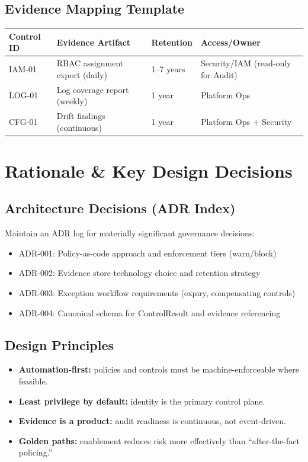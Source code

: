 \documentclass[11pt]{report}
\begin{document}
\subsection{Evidence Mapping Template}
\begin{tabularx}{\textwidth}{@{}l l l >{\raggedright\arraybackslash}X@{}}
\toprule
\textbf{Control ID} & \textbf{Evidence Artifact} & \textbf{Retention} & \textbf{Access/Owner} \\
\midrule
IAM-01 & RBAC assignment export (daily) & 1--7 years & Security/IAM (read-only for Audit) \\
LOG-01 & Log coverage report (weekly) & 1 year & Platform Ops \\
CFG-01 & Drift findings (continuous) & 1 year & Platform Ops + Security \\
\bottomrule
\end{tabularx}

\section{Rationale \& Key Design Decisions}
\subsection{Architecture Decisions (ADR Index)}
Maintain an ADR log for materially significant governance decisions:
\begin{itemize}
  \item ADR-001: Policy-as-code approach and enforcement tiers (warn/block)
  \item ADR-002: Evidence store technology choice and retention strategy
  \item ADR-003: Exception workflow requirements (expiry, compensating controls)
  \item ADR-004: Canonical schema for ControlResult and evidence referencing
\end{itemize}

\subsection{Design Principles}
\begin{itemize}
  \item \textbf{Automation-first:} policies and controls must be machine-enforceable where feasible.
  \item \textbf{Least privilege by default:} identity is the primary control plane.
  \item \textbf{Evidence is a product:} audit readiness is continuous, not event-driven.
  \item \textbf{Golden paths:} enablement reduces risk more effectively than “after-the-fact policing.”
\end{itemize}
\end{document}
